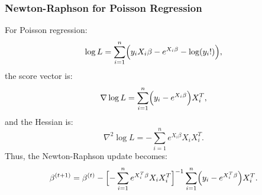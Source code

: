 \documentclass{beamer}
\begin{document}
\begin{frame}
\frametitle{Newton-Raphson for Poisson Regression}
For Poisson regression:
\[
\log L = \sum_{i=1}^n \Bigl( y_i X_i \beta - e^{X_i \beta} - \log (y_i!) \Bigr),
\]
the score vector is:
\[
\nabla \log L = \sum_{i=1}^n \Bigl( y_i - e^{X_i \beta} \Bigr) X_i^T,
\]
and the Hessian is:
\[
\nabla^2 \log L = - \sum_{i=1}^n e^{X_i \beta} X_i X_i^T.
\]
Thus, the Newton-Raphson update becomes:
\[
\beta^{(t+1)} = \beta^{(t)} - \Bigl[-\sum_{i=1}^n e^{X_i^T \beta} X_i X_i^T\Bigr]^{-1} \sum_{i=1}^n \Bigl( y_i - e^{X_i^T \beta} \Bigr) X_i^T.
\]
\end{frame}

%
%
%
\end{document}
